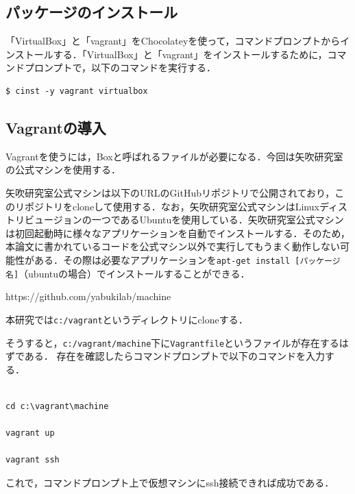 \subsection{パッケージのインストール}
「VirtualBox」と「vagrant」をChocolateyを使って，コマンドプロンプトからインストールする．「VirtualBox」と「vagrant」をインストールするために，コマンドプロンプトで，以下のコマンドを実行する．
\begin{verbatim}
$ cinst -y vagrant virtualbox
\end{verbatim}
\newpage

\subsection{Vagrantの導入}
Vagrantを使うには，Boxと呼ばれるファイルが必要になる．今回は矢吹研究室の公式マシンを使用する．

矢吹研究室公式マシンは以下のURLのGitHubリポジトリで公開されており，このリポジトリをcloneして使用する．なお，矢吹研究室公式マシンはLinuxディストリビュージョンの一つであるUbuntuを使用している．矢吹研究室公式マシンは初回起動時に様々なアプリケーションを自動でインストールする．そのため，本論文に書かれているコードを公式マシン以外で実行してもうまく動作しない可能性がある．その際は必要なアプリケーションを\texttt{apt-get install [パッケージ名]}（ubuntuの場合）でインストールすることができる．

https://github.com/yabukilab/machine

本研究では\texttt{c:/vagrant}というディレクトリにcloneする．

そうすると，\texttt{c:/vagrant/machine}下に\texttt{Vagrantfile}というファイルが存在するはずである．
存在を確認したらコマンドプロンプトで以下のコマンドを入力する．

\begin{verbatim}

cd c:\vagrant\machine

vagrant up

vagrant ssh

\end{verbatim}

これで，コマンドプロンプト上で仮想マシンにssh接続できれば成功である．
\newpage


